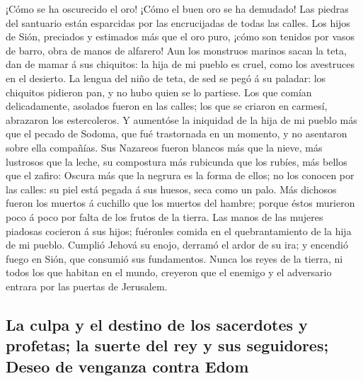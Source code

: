 ¡Cómo se ha oscurecido el oro! ¡Cómo el buen oro se ha
demudado! Las piedras del santuario están esparcidas por las
encrucijadas de todas las calles.  Los hijos de Sión,
preciados y estimados más que el oro puro, ¡cómo son tenidos por vasos
de barro, obra de manos de alfarero!  Aun los monstruos
marinos sacan la teta, dan de mamar á sus chiquitos: la hija de mi
pueblo es cruel, como los avestruces en el desierto.  La
lengua del niño de teta, de sed se pegó á su paladar: los chiquitos
pidieron pan, y no hubo quien se lo partiese.  Los que
comían delicadamente, asolados fueron en las calles; los que se criaron
en carmesí, abrazaron los estercoleros.  Y aumentóse la
iniquidad de la hija de mi pueblo más que el pecado de Sodoma, que fué
trastornada en un momento, y no asentaron sobre ella compañías.
 Sus Nazareos fueron blancos más que la nieve, más lustrosos
que la leche, su compostura más rubicunda que los rubíes, más bellos que
el zafiro:  Oscura más que la negrura es la forma de ellos;
no los conocen por las calles: su piel está pegada á sus huesos, seca
como un palo.  Más dichosos fueron los muertos á cuchillo
que los muertos del hambre; porque éstos murieron poco á poco por falta
de los frutos de la tierra.  Las manos de las mujeres
piadosas cocieron á sus hijos; fuéronles comida en el quebrantamiento de
la hija de mi pueblo.  Cumplió Jehová su enojo, derramó el
ardor de su ira; y encendió fuego en Sión, que consumió sus fundamentos.
 Nunca los reyes de la tierra, ni todos los que habitan en
el mundo, creyeron que el enemigo y el adversario entrara por las
puertas de Jerusalem.

\hypertarget{la-culpa-y-el-destino-de-los-sacerdotes-y-profetas-la-suerte-del-rey-y-sus-seguidores-deseo-de-venganza-contra-edom}{%
\subsection{La culpa y el destino de los sacerdotes y profetas; la
suerte del rey y sus seguidores; Deseo de venganza contra
Edom}\label{la-culpa-y-el-destino-de-los-sacerdotes-y-profetas-la-suerte-del-rey-y-sus-seguidores-deseo-de-venganza-contra-edom}}


